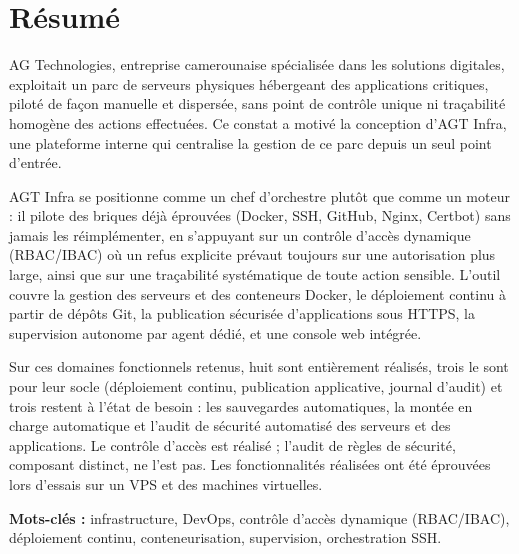 \chapter*{Résumé}

AG Technologies, entreprise camerounaise spécialisée dans les solutions
digitales, exploitait un parc de serveurs physiques hébergeant des
applications critiques, piloté de façon manuelle et dispersée, sans
point de contrôle unique ni traçabilité homogène des actions effectuées.
Ce constat a motivé la conception d'AGT Infra, une plateforme interne
qui centralise la gestion de ce parc depuis un seul point d'entrée.

AGT Infra se positionne comme un chef d'orchestre plutôt que comme un
moteur : il pilote des briques déjà éprouvées (Docker, SSH, GitHub,
Nginx, Certbot) sans jamais les réimplémenter, en s'appuyant sur un
contrôle d'accès dynamique (RBAC/IBAC) où un refus explicite prévaut
toujours sur une autorisation plus large, ainsi que sur une traçabilité
systématique de toute action sensible. L'outil couvre la gestion des
serveurs et des conteneurs Docker, le déploiement continu à partir de
dépôts Git, la publication sécurisée d'applications sous HTTPS, la
supervision autonome par agent dédié, et une console web intégrée.

Sur ces domaines fonctionnels retenus, huit sont entièrement
réalisés, trois le sont pour leur socle (déploiement continu,
publication applicative, journal d'audit) et trois restent à l'état de
besoin : les sauvegardes automatiques, la montée en charge automatique
et l'audit de sécurité automatisé des serveurs et des applications. Le
contrôle d'accès est réalisé ; l'audit de règles de sécurité, composant
distinct, ne l'est pas. Les fonctionnalités réalisées ont été éprouvées
lors d'essais sur un VPS et des machines virtuelles.

\bigskip
\noindent\textbf{Mots-clés :} infrastructure, DevOps, contrôle d'accès
dynamique (RBAC/IBAC), déploiement continu, conteneurisation,
supervision, orchestration SSH.